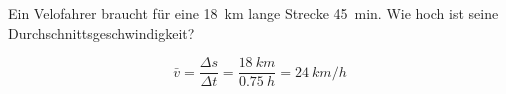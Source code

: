 
\begin{aufgabe}
	Ein Velofahrer braucht für eine \SI{18}{km} lange Strecke \SI{45}{min}. Wie hoch ist seine Durchschnittsgeschwindigkeit?



	\begin{loesung}
		\begin{equation*}
		\bar{v}=\frac{\Delta s}{\Delta t}=\frac{\SI{18}{km}}{\SI{0.75}{h}}=\SI{24}{km/h}
		\end{equation*}
	\end{loesung}
\end{aufgabe}

